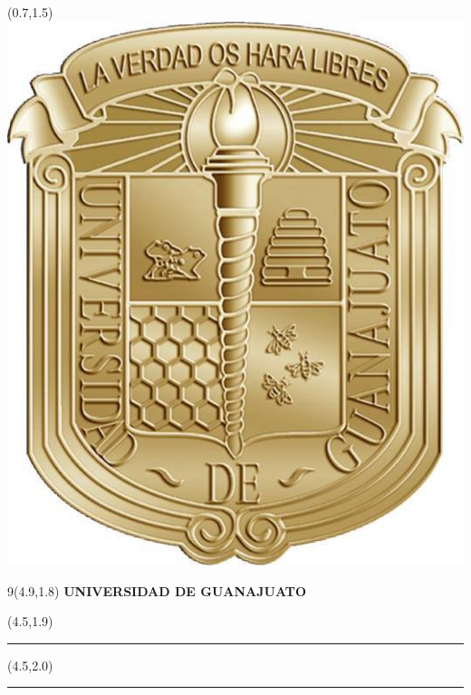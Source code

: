 

%
\thispagestyle{empty}
\begin{textblock}{6}(0.7,1.5)
	\includegraphics[scale=0.21]{UG}
\end{textblock}

\begin{center}	
	\begin{textblock} {9}(4.9,1.8)
		\Large{\textbf{UNIVERSIDAD DE GUANAJUATO}}
	\end{textblock}
\end{center}

\begin{textblock}{10}(4.5,1.9) 
	
	\begin{flushleft}
		\rule{13.5cm}{1.0mm}
	\end{flushleft}
\end{textblock}

\begin{textblock}{10}(4.5,2.0) 
	
	\begin{flushleft}
		\rule{13.5cm}{0.5mm}
	\end{flushleft}
\end{textblock}


